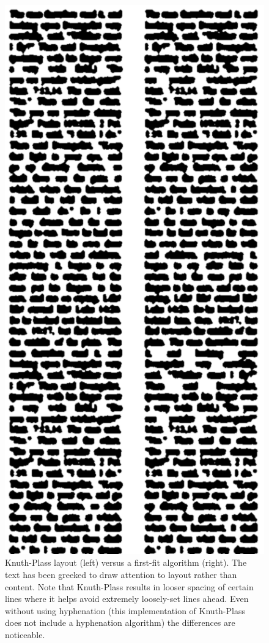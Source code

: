 \begin{figure}
\begin{center}
\includegraphics[height=0.8\textheight]{gfx/greek}
\end{center}
\caption[Knuth-Plass layout versus a first-fit algorithm]{Knuth-Plass layout (left) versus a first-fit algorithm (right). The text has been greeked to draw attention to layout rather than content. Note that Knuth-Plass results in looser spacing of certain lines where it helps avoid extremely loosely-set lines ahead. Even without using hyphenation (this implementation of Knuth-Plass does not include a hyphenation algorithm) the differences are noticeable. }
\label{fig:greek}
\end{figure}

